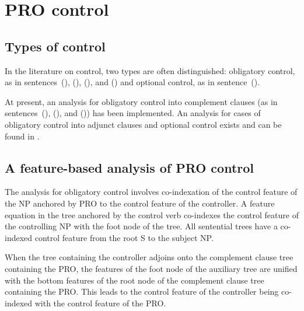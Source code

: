 


\section{PRO control}
\label{PRO-control}

\subsection{Types of control}

In the literature on control, two types are often distinguished: obligatory
control, as in sentences~(), (), (), and () and optional 
control, as in sentence~().


At present, an analysis for obligatory control into complement clauses
(as in sentences~(), (), and ()) has been implemented. An
analysis for cases of obligatory control into adjunct clauses and optional
control exists and can be found in \cite{bhatt94}.

\subsection{A feature-based analysis of PRO control}
The analysis for obligatory control involves co-indexation of the control feature
of the NP anchored by PRO to the control feature of the controller.
A feature equation in the tree anchored by the control verb 
co-indexes the control feature of the controlling NP with the foot
node of the tree.  All sentential trees have a co-indexed
control feature from the root S to the subject NP. 

When the tree containing the controller adjoins
onto the complement clause tree containing the PRO, 
the features of the foot node of the
auxiliary tree are unified with the bottom features of the root node of the 
complement clause
tree containing the PRO. This leads to the control feature of the controller
being co-indexed with the control feature of the PRO.

